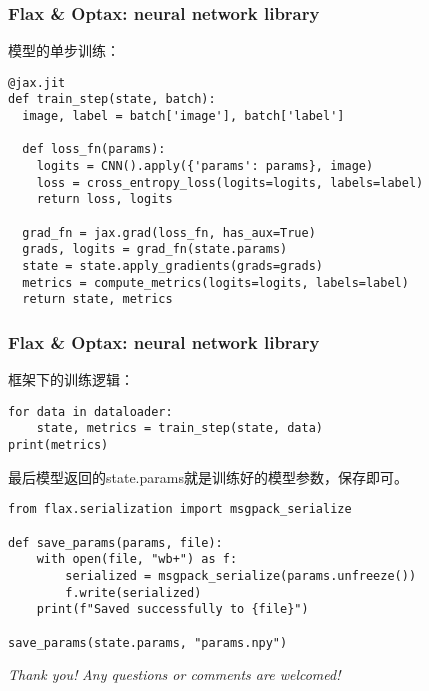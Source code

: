 \documentclass{beamer}
\begin{document}
\begin{frame}[fragile]
\frametitle{Flax \& Optax: neural network library}
模型的单步训练：
\begin{verbatim}
@jax.jit
def train_step(state, batch):
  image, label = batch['image'], batch['label']

  def loss_fn(params):
    logits = CNN().apply({'params': params}, image)
    loss = cross_entropy_loss(logits=logits, labels=label)
    return loss, logits

  grad_fn = jax.grad(loss_fn, has_aux=True)
  grads, logits = grad_fn(state.params)
  state = state.apply_gradients(grads=grads)
  metrics = compute_metrics(logits=logits, labels=label)
  return state, metrics
\end{verbatim}
\end{frame}

\begin{frame}[fragile]
\frametitle{Flax \& Optax: neural network library}
框架下的训练逻辑：
\begin{verbatim}
for data in dataloader:
    state, metrics = train_step(state, data)
print(metrics)
\end{verbatim}
最后模型返回的state.params就是训练好的模型参数，保存即可。
\begin{verbatim}
from flax.serialization import msgpack_serialize

def save_params(params, file):
    with open(file, "wb+") as f:
        serialized = msgpack_serialize(params.unfreeze())
        f.write(serialized)
    print(f"Saved successfully to {file}")

save_params(state.params, "params.npy")
\end{verbatim}
\end{frame}

\begin{frame}{}
  \centering \Large
  \emph{Thank you!}
  \emph{Any questions or comments are welcomed!}
\end{frame}



\end{document}
